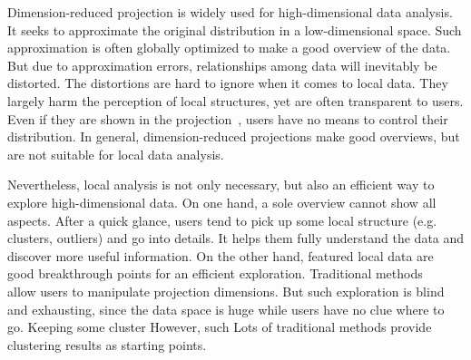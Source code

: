 \maketitle
Dimension-reduced projection is widely used for high-dimensional data analysis. It seeks to approximate the original distribution in a low-dimensional space. Such approximation is often globally optimized to make a good overview of the data. But due to approximation errors, relationships among data will inevitably be distorted. The distortions are hard to ignore when it comes to local data. They largely harm the perception of local structures, yet are often transparent to users. Even if they are shown in the projection~\cite{DBLP:journals/tvcg/StahnkeDMT16}, users have no means to control their distribution. In general, dimension-reduced projections make good overviews, but are not suitable for local data analysis.

Nevertheless, local analysis is not only necessary, but also an efficient way to explore high-dimensional data. On one hand, a sole overview cannot show all aspects. After a quick glance, users tend to pick up some local structure (e.g. clusters, outliers) and go into details. It helps them fully understand the data and discover more useful information. On the other hand, featured local data are good breakthrough points for an efficient exploration. Traditional methods~\cite{DBLP:journals/tvcg/NamM13}~\cite{DBLP:journals/cgf/JeongZFRC09}~\cite{DBLP:journals/tvcg/LehmannT13} allow users to manipulate projection dimensions. But such exploration is blind and exhausting, since the data space is huge while users have no clue where to go. Keeping some cluster However, such Lots of traditional methods provide clustering results as starting points.